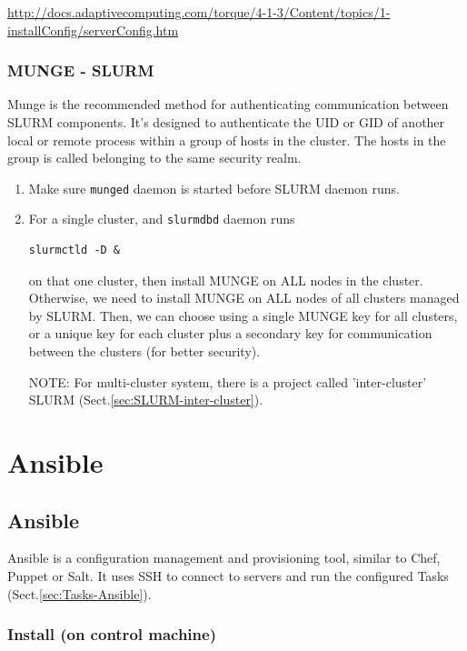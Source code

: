 \url{http://docs.adaptivecomputing.com/torque/4-1-3/Content/topics/1-installConfig/serverConfig.htm}


\subsection{MUNGE - SLURM}
\label{sec:MUNGE_SLURM}

Munge is the recommended method for authenticating communication between SLURM
components. It's designed to authenticate the UID or GID of another local or
remote process within a group of hosts in the cluster. The hosts in the group is
called belonging to the same security realm.

\begin{enumerate}
  \item  Make sure \verb!munged! daemon is started before SLURM daemon runs.
  
  \item For a single cluster, and \verb!slurmdbd! daemon runs
  
\begin{verbatim}	
slurmctld -D &
\end{verbatim} 
on that one  cluster, then install MUNGE on ALL nodes in the cluster. Otherwise, we need to install MUNGE on ALL
nodes of all clusters managed by SLURM. Then, we can choose using a single MUNGE
key for all clusters, or a unique key for each cluster plus a secondary key for
communication between the clusters (for better security).

NOTE: For multi-cluster system, there is a project called 'inter-cluster' SLURM 
(Sect.\ref{sec:SLURM-inter-cluster}).

\end{enumerate}

\chapter{Ansible}

\section{Ansible}
\label{sec:Ansible}

Ansible is a configuration management and provisioning tool, similar to Chef,
Puppet or Salt. It uses SSH to connect to servers and run the configured Tasks
(Sect.\ref{sec:Tasks-Ansible}).

\subsection{Install (on control machine)}
\label{sec:ansible-control-machine}


